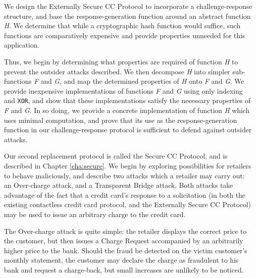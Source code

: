 We design the Externally Secure CC Protocol to incorporate a challenge-response structure,
    and base the response-generation function around an abstract function \emph{H}.
We determine that while a cryptographic hash function would suffice, such functions are comparatively expensive and provide properties unneeded for this application.

Thus, we begin by determining what properties are required of function \emph{H} to prevent the outsider attacks described.
We then decompose \emph{H} into simpler sub-functions \emph{F} and \emph{G}, and map the determined properties of \emph{H} onto \emph{F} and \emph{G}.
We provide inexpensive implementations of functions \emph{F} and \emph{G} using only indexing and \texttt{XOR},
    and show that these implementations satisfy the necessary properties of \emph{F} and \emph{G}.
In so doing, we provide a concrete implementation of function \emph{H} which uses minimal computation,
    and prove that its use as the response-generation function in our challenge-response protocol is sufficient to defend against outsider attacks.


Our second replacement protocol is called the Secure CC Protocol, and is described in Chapter \ref{cha:secure}.
We begin by exploring possibilities for retailers to behave maliciously, and describe two attacks which a retailer may carry out:
    an Over-charge attack, and a Transparent Bridge attack.
Both attacks take advantage of the fact that a credit card's response to a solicitation
    (in both the existing contactless credit card protocol, and the Externally Secure CC Protocol)
    may be used to issue an arbitrary charge to the credit card.

The Over-charge attack is quite simple:
    the retailer displays the correct price to the customer, but then issues a Charge Request accompanied by an arbitrarily higher price to the bank.
Should the fraud be detected on the victim customer's monthly statement, the customer may declare the charge as fraudulent to his bank and request a charge-back,
    but small increases are unlikely to be noticed.

